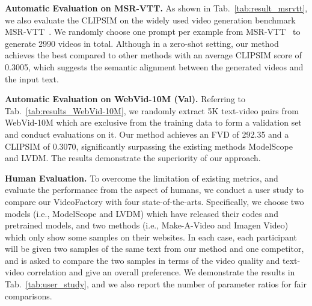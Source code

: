 \documentclass{article}
\begin{document}
\noindent \textbf{Automatic Evaluation on MSR-VTT.} As shown in Tab.~\ref{tab:result_msrvtt}, we also evaluate the CLIPSIM on the widely used video generation benchmark MSR-VTT~\cite{xu2016msr}. We randomly choose one prompt per example from MSR-VTT~\cite{xu2016msr} to generate 2990 videos in total. Although in a zero-shot setting, our method achieves the best compared to other methods with an average CLIPSIM score of 0.3005, which suggests the semantic alignment between the generated videos and the input text.

\noindent \textbf{Automatic Evaluation on WebVid-10M (Val).} 
Referring to Tab.~\ref{tab:results_WebVid-10M}, we randomly extract 5K text-video pairs from WebVid-10M which are exclusive from the training data to form a validation set and conduct evaluations on it.
Our method achieves an FVD of 292.35 and a CLIPSIM of 0.3070, significantly surpassing the existing methods ModelScope and LVDM. The results demonstrate the superiority of our approach.

\noindent \textbf{Human Evaluation.}
To overcome the limitation of existing metrics, and evaluate the performance from the aspect of humans, we conduct a user study to compare our VideoFactory with four state-of-the-arts. Specifically, we choose two models (i.e., ModelScope and LVDM) which have released their codes and pretrained models, and two methods (i.e., Make-A-Video and Imagen Video) which only show some samples on their websites. In each case, each participant will be given two samples of the same text from our method and one competitor, and is asked to compare the two samples in terms of the video quality and text-video correlation and give an overall preference. We demonstrate the results in Tab.~\ref{tab:user_study}, and we also report the number of parameter ratios for fair comparisons.

\begin{table}[t]
\centering
\caption{User Preference. The number indicates the percentage of humans that prefer our method over the compared method. We also show the ratio of the network parameter v.s. Ours.}
\vspace{1mm}
\renewcommand{\arraystretch}{1.2}
\label{tab:user_study}
\end{table}
\end{document}
